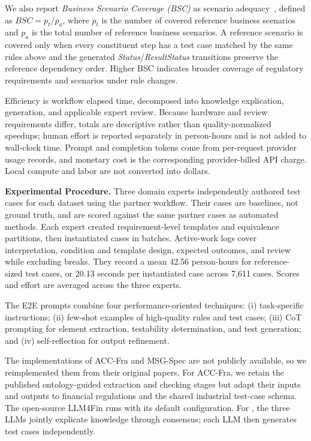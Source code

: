We also report \textit{Business Scenario Coverage (BSC)} as scenario
adequacy~\cite{xue2024llm4fin}, defined as $\mathit{BSC}=p_t/p_a$, where $p_t$
is the number of covered reference business scenarios and $p_a$ is the total
number of reference business scenarios. A reference scenario is covered only
when every constituent step has a test case matched by the same rules above
and the generated \textit{Status}/\textit{ResultStatus} transitions preserve
the reference dependency order. Higher BSC indicates broader coverage of
regulatory requirements and scenarios under rule changes.

Efficiency is workflow elapsed
time, decomposed into knowledge explication, generation, and applicable expert
review. Because hardware and review requirements differ, totals are descriptive
rather than quality-normalized speedups; human effort is reported separately
in person-hours and is not added to wall-clock time. Prompt and completion
tokens come from per-request provider usage records, and monetary cost is the
corresponding provider-billed API charge. Local compute and labor are not
converted into dollars.

\noindent
\textbf{Experimental Procedure.}
Three domain experts independently authored test cases for each dataset using
the partner workflow. Their cases are baselines, not ground truth, and are
scored against the same partner cases as automated methods. Each expert created
requirement-level templates and equivalence partitions, then instantiated cases
in batches. Active-work logs cover interpretation, condition and template
design, expected outcomes, and review while excluding breaks. They record a
mean 42.56 person-hours for reference-sized test cases, or 20.13 seconds per
instantiated case across 7,611 cases. Scores and effort are averaged across the
three experts.

The E2E prompts combine four performance-oriented techniques: (i) task-specific
instructions; (ii) few-shot examples of high-quality rules and test cases;
(iii) CoT prompting for element extraction, testability determination, and test
generation; and (iv) self-reflection for output refinement.

The implementations of ACC-Fra and MSG-Spec are not publicly available, so we
reimplemented them from their original papers. For ACC-Fra, we retain the published
ontology-guided extraction and checking stages but adapt their inputs and
outputs to financial regulations and the shared industrial test-case schema.
The open-source LLM4Fin runs with its default configuration.
For \ourtool, the three LLMs jointly explicate knowledge through consensus;
each LLM then generates test cases independently.

